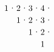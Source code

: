 \documentclass[a4paper,11pt]{amsart}
\begin{document}
\[{		}
		{%
			\begin{tikzpicture}[xscale = 0.5, yscale=-0.5]
				\draw (0.5,0.5)  node{$1$};
				\draw (1.5,0.5)  node{$2$};
				\draw (2.5,0.5)  node{$3$};
				\draw (3.5,0.5)  node{$4$};
				\draw (1.5,1.5)  node{$1$};
				\draw (2.5,1.5)  node{$2$};
				\draw (3.5,1.5)  node{$3$};
				\draw (2.5,2.5)  node{$1$};
				\draw (3.5,2.5)  node{$2$};
				\draw (3.5,3.5)  node{$1$};
				\node at (1,0.5) {$\cdot$};
				\node at (2,0.5) {$\cdot$};
				\node at (3,0.5) {$\cdot$};
				\node at (4,0.5) {$\cdot$};
				\node at (2,1.5) {$\cdot$};
				\node at (3,1.5) {$\cdot$};
				\node at (4,1.5) {$\cdot$};
				\node at (3,2.5) {$\cdot$};
				\node at (4,2.5) {$\cdot$};
			\end{tikzpicture}\hfill
		}
		\]
\end{document}
